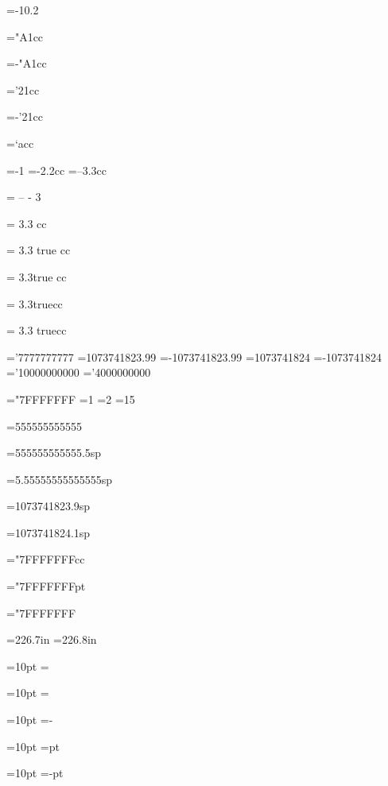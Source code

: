 =-10.2
\showthe{}

="A1cc
\showthe{}

=-"A1cc
\showthe{}

='21cc
\showthe{}

=-'21cc
\showthe{}

=`acc
\showthe{}

=-1
\showthe{}
=-2.2cc
\showthe{}
=--3.3cc
\showthe{}

  =  -- - 3  
\showthe{}

 = 3.3  cc
\showthe{}

 = 3.3 true cc
\showthe{}

 = 3.3true cc
\showthe{}

 = 3.3truecc
\showthe{}

 = 3.3 truecc
\showthe{}

='7777777777
\showthe{}
=1073741823.99
\showthe{}
=-1073741823.99
\showthe{}
=1073741824
\showthe{}
=-1073741824
\showthe{}
='10000000000
\showthe{}
='4000000000
\showthe{}

="7FFFFFFF
=1
\showthe{}
=2
\showthe{}
=15
\showthe{}

=555555555555
\showthe{}

=555555555555.5sp
\showthe{}

=5.55555555555555sp
\showthe{}

=1073741823.9sp
\showthe{}

=1073741824.1sp
\showthe{}

="7FFFFFFFcc
\showthe{}

="7FFFFFFFpt
\showthe{}

="7FFFFFFF
\showthe{}

=226.7in
\showthe{}
=226.8in
\showthe{}

=10pt
=\relax\relax
\showthe{}

=10pt
=\relax
\showthe{}

=10pt
=-\relax
\showthe{}

=10pt
=pt
\showthe{}

=10pt
=-pt
\showthe{}







